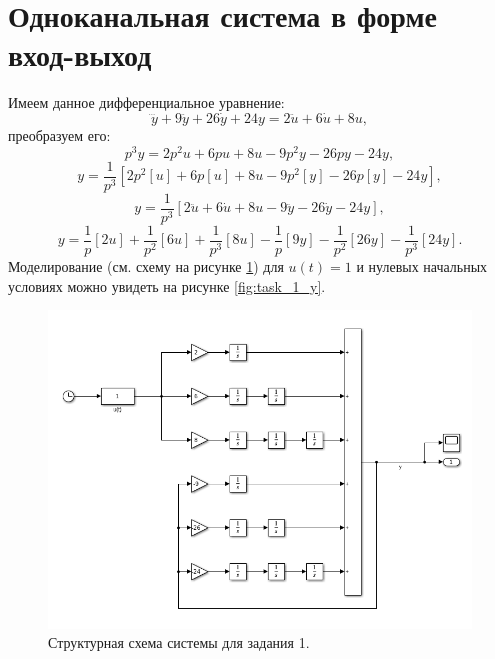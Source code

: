 \section{Одноканальная система в форме вход-выход}

Имеем данное дифференциальное уравнение:
\begin{equation*}
    \dddot y + 9\ddot y + 26\dot y + 24 y = 2\ddot u +6\dot u +8 u,
\end{equation*}
преобразуем его:
\begin{equation*}
    p^3y=2p^2u+6pu+8u-9p^2y-26py-24y,
\end{equation*}
\begin{equation*}
    y=\frac{1}{p^3}[2p^2[u]+6p[u]+8u-9p^2[y]-26p[y]-24y],
\end{equation*}
\begin{equation*}
    y=\frac{1}{p^3}[2\ddot u+6\dot u+8u-9\ddot y-26\dot y-24y],
\end{equation*}
\begin{equation*}
    y=\frac{1}{p}[2u]+\frac{1}{p^2}[6u]+\frac{1}{p^3}[8u]-\frac{1}{p}[9y]-\frac{1}{p^2}[26y]-\frac{1}{p^3}[24y].
\end{equation*}
Моделирование (см. схему на рисунке \ref{fig:task_1_slx}) для $u(t)=1$ и 
нулевых начальных условиях можно увидеть на рисунке \ref{fig:task_1_y}.

\begin{figure}[htbp]
    \centering
    \includegraphics[width=\linewidth]{figs/task_1_slx.png}
    \caption{Структурная схема системы для задания 1.}
    \label{fig:task_1_slx}
\end{figure}

